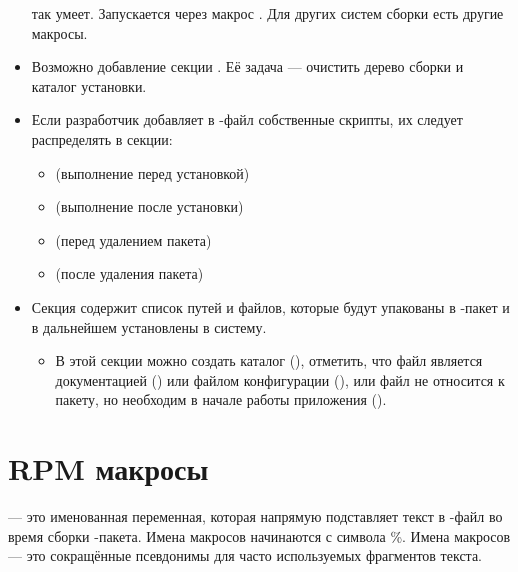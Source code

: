 \begin{itemize}
		так умеет. Запускается через макрос . Для других систем сборки есть другие макросы.
	\item Возможно добавление секции . Её задача --- очистить дерево сборки и каталог установки.
	\item Если разработчик добавляет в -файл собственные скрипты, их следует распределять в секции: 
	\begin{itemize}
		\item {} (выполнение перед установкой)
		\item {} (выполнение после установки)
		\item {} (перед удалением пакета)
		\item {} (после удаления пакета)
	\end{itemize}
	\item Секция  содержит список путей и файлов, которые будут упакованы в -пакет 
		и в дальнейшем установлены в систему.
	\begin{itemize}
		\item В этой секции можно создать каталог (), отметить, что файл является 
			документацией () или файлом конфигурации (), или файл не 
			относится к пакету, но необходим в начале работы приложения ().
	\end{itemize} 
\end{itemize}


\section{RPM макросы}
 --- это именованная переменная, которая напрямую подставляет текст в -файл 
во время сборки -пакета. Имена макросов начинаются с символа \%. Имена макросов --- это 
сокращённые псевдонимы для часто используемых фрагментов текста. 
	
